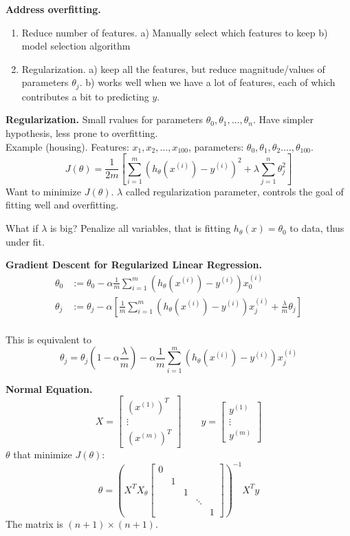 \documentclass[a4 paper, 11 pt]{article}
\begin{document}
\textbf{Address overfitting.}
\begin{enumerate}
\item Reduce number of features. a) Manually select which features to keep b) model selection algorithm
\item Regularization. a) keep all the features, but reduce magnitude/values of parameters $\theta_j$. b) works well when we have a lot of features, each of which contributes a bit to predicting $y$.
\end{enumerate}

\textbf{Regularization.} Small rvalues for parameters $\theta_0, \theta_1, \ldots, \theta_n$. Have simpler hypothesis, less prone to overfitting.\\
Example (housing). Features: $x_1, x_2, \ldots, x_100$, parameters: $\theta_0, \theta_1, \theta_2. \ldots, \theta_100$.
\[
J(\theta) = \frac{1}{2m}\left[\sum_{i=1}^m (h_\theta(x^{(i)}) - y^{(i)})^2 + \lambda \sum_{j=1}^n \theta_j^2\right]
\]
Want to minimize $J(\theta)$. $\lambda$ called regularization parameter, controls the goal of fitting well and overfitting.

What if $\lambda$ is big? Penalize all variables, that is fitting $h_\theta(x) = \theta_0$ to data, thus under fit.

\textbf{Gradient Descent for Regularized Linear Regression.}
\begin{align*}
\theta_0 &:= \theta_0 - \alpha\frac{1}{m}\sum_{i=1}^m (h_\theta(x^{(i)}) - y^{(i)})x_0^{(i)} \\
\theta_j &:= \theta_j - \alpha \left[ \frac{1}{m}\sum_{i=1}^m (h_\theta(x^{(i)}) - y^{(i)})x_j^{(i)} + \frac{\lambda}{m}\theta_j\right]\\
\end{align*}

This is equivalent to
\[
\theta_j = \theta_j(1 - \alpha\frac{\lambda}{m}) - \alpha \frac{1}{m} \sum_{i=1}^m (h_\theta(x^{(i)}) - y^{(i)} ) x^{(i)}_j
\]

\textbf{Normal Equation.}
\[
X = \begin{bmatrix} (x^{(1)})^T \\ \vdots \\ (x^{(m)})^T \end{bmatrix} \qquad y = \begin{bmatrix}y^{(1)} \\ \vdots \\ y^{(m)} \end{bmatrix}
\]
$\theta$ that minimize $J(\theta)$:
\[
\theta = (X^TX _ \theta \begin{bmatrix} 0 \\  & 1 \\ & & 1 \\ &&&\ddots \\ &&&&1\end{bmatrix})^{-1}X^Ty
\]
The matrix is $(n+1) \times (n+1)$.
\end{document}
